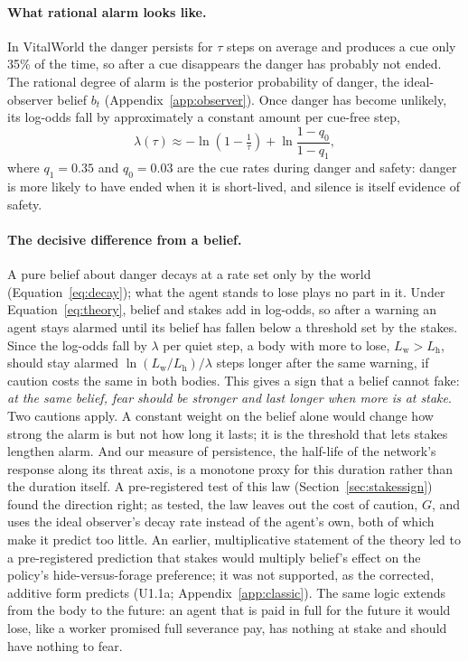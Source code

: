 \documentclass[11pt]{article}
\begin{document}
\paragraph{What rational alarm looks like.} In VitalWorld the danger persists for $\tau$ steps on average and produces a cue only 35\% of the time, so after a cue disappears the danger has probably not ended. The rational degree of alarm is the posterior probability of danger, the ideal-observer belief $b_t$ (Appendix~\ref{app:observer}). Once danger has become unlikely, its log-odds fall by approximately a constant amount per cue-free step,
\begin{equation}
\lambda(\tau)\approx -\ln\!\left(1-\tfrac{1}{\tau}\right)+\ln\frac{1-q_0}{1-q_1},
\label{eq:decay}
\end{equation}
where $q_1=0.35$ and $q_0=0.03$ are the cue rates during danger and safety: danger is more likely to have ended when it is short-lived, and silence is itself evidence of safety.

\paragraph{The decisive difference from a belief.} A pure belief about danger decays at a rate set only by the world (Equation~\ref{eq:decay}); what the agent stands to lose plays no part in it. Under Equation~\ref{eq:theory}, belief and stakes add in log-odds, so after a warning an agent stays alarmed until its belief has fallen below a threshold set by the stakes. Since the log-odds fall by $\lambda$ per quiet step, a body with more to lose, $L_{\text{w}}>L_{\text{h}}$, should stay alarmed $\ln(L_{\text{w}}/L_{\text{h}})/\lambda$ steps longer after the same warning, if caution costs the same in both bodies. This gives a sign that a belief cannot fake: \emph{at the same belief, fear should be stronger and last longer when more is at stake}. Two cautions apply. A constant weight on the belief alone would change how strong the alarm is but not how long it lasts; it is the threshold that lets stakes lengthen alarm. And our measure of persistence, the half-life of the network's response along its threat axis, is a monotone proxy for this duration rather than the duration itself. A pre-registered test of this law (Section~\ref{sec:stakessign}) found the direction right; as tested, the law leaves out the cost of caution, $G$, and uses the ideal observer's decay rate instead of the agent's own, both of which make it predict too little. An earlier, multiplicative statement of the theory led to a pre-registered prediction that stakes would multiply belief's effect on the policy's hide-versus-forage preference; it was not supported, as the corrected, additive form predicts (U1.1a; Appendix~\ref{app:classic}). The same logic extends from the body to the future: an agent that is paid in full for the future it would lose, like a worker promised full severance pay, has nothing at stake and should have nothing to fear.
\end{document}
